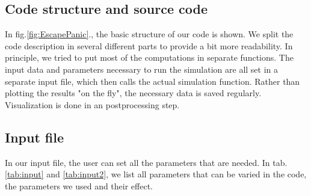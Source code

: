 \documentclass[11pt]{article}
\begin{document}
\begin{appendix}
\section{Code structure and source code}
In fig.\ref{fig:EscapePanic}., the basic structure of our code is shown. We split the code description in several different parts to provide a bit more readability. In principle, we tried to put most of the computations in separate functions. The input data and parameters necessary to run the simulation are all set in a separate input file, which then calls the actual simulation function. Rather than plotting the results "on the fly", the necessary data is saved regularly. Visualization is done in an postprocessing step.
\subsection{Input file}\label{sec:input_file}
In our input file, the user can set all the parameters that are needed. In tab.\ref{tab:input} and \ref{tab:input2}, we list all parameters that can be varied in the code, the  parameters we used and their effect.


\end{appendix}
\end{document}
